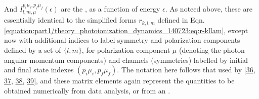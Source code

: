 \documentclass[letterpaper,table,10pt,english]{jupyterBook}
\begin{document}
\sphinxAtStartPar
And \(I_{l,m,\mu}^{p_{i}\mu_{i},p_{f}\mu_{f}}(\epsilon)\) are the {\hyperref[\detokenize{backmatter/glossary:term-radial-matrix-elements}]{}}, as a function of energy \(\epsilon\).
As noteed above, these {\hyperref[\detokenize{backmatter/glossary:term-radial-matrix-elements}]{}} are essentially identical to the simplified forms
\(r_{k,l,m}\) defined in Eqn. \eqref{equation:part1/theory_photoionization_dynamics_140723:eq:r-kllam}, except now with additional indices to label
symmetry and polarization components defined by a set of {\hyperref[\detokenize{backmatter/glossary:term-partial-waves}]{}}
\(\{l,m\}\), for polarization component \(\mu\) (denoting the photon angular
momentum components) and channels (symmetries) labelled by initial and
final state indexes \((p_{i}\mu_{i},p_{f}\mu_{f})\). The notation here
follows that used by  {[}\hyperlink{cite.backmatter/bibliography:id762}{36}, \hyperlink{cite.backmatter/bibliography:id626}{37}, \hyperlink{cite.backmatter/bibliography:id803}{38}, \hyperlink{cite.backmatter/bibliography:id765}{39}{]}, and these matrix elements again represent the quantities to be obtained numerically from data analysis, or from an .
\end{document}
